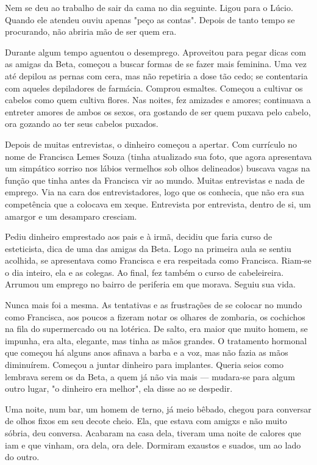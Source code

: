 \documentclass[11pt,a4paper,twoside,openany]{book}
\begin{document}
Nem se deu ao trabalho de sair da cama no dia seguinte. Ligou para o Lúcio. Quando ele atendeu ouviu apenas "peço as contas". Depois de tanto tempo se procurando, não abriria mão de ser quem era.

Durante algum tempo aguentou o desemprego. Aproveitou para pegar dicas com as amigas da Beta, começou a buscar formas de se fazer mais feminina. Uma vez até depilou as pernas com cera, mas não repetiria a dose tão cedo; se contentaria com aqueles depiladores de farmácia. Comprou esmaltes. Começou a cultivar os cabelos como quem cultiva flores. Nas noites, fez amizades e amores; continuava a entreter amores de ambos os sexos, ora gostando de ser quem puxava pelo cabelo, ora gozando ao ter seus cabelos puxados.

Depois de muitas entrevistas, o dinheiro começou a apertar. Com currículo no nome de Francisca Lemes Souza (tinha atualizado sua foto, que agora apresentava um simpático sorriso nos lábios vermelhos sob olhos delineados) buscava vagas na função que tinha antes da Francisca vir ao mundo. Muitas entrevistas e nada de emprego. Via na cara dos entrevistadores, logo que os conhecia, que não era sua competência que a colocava em xeque. Entrevista por entrevista, dentro de si, um amargor e um desamparo cresciam.

Pediu dinheiro emprestado aos pais e à irmã, decidiu que faria curso de esteticista, dica de uma das amigas da Beta. Logo na primeira aula se sentiu acolhida, se apresentava como Francisca e era respeitada como Francisca. Riam-se o dia inteiro, ela e as colegas. Ao final, fez também o curso de cabeleireira. Arrumou um emprego no bairro de periferia em que morava. Seguiu sua vida.

Nunca mais foi a mesma. As tentativas e as frustrações de se colocar no mundo como Francisca, aos poucos a fizeram notar os olhares de zombaria, os cochichos na fila do supermercado ou na lotérica. De salto, era maior que muito homem, se impunha, era alta, elegante, mas tinha as mãos grandes. O tratamento hormonal que começou há alguns anos afinava a barba e a voz, mas não fazia as mãos diminuírem. Começou a juntar dinheiro para implantes. Queria seios como lembrava serem os da Beta, a quem já não via mais --- mudara-se para algum outro lugar, "o dinheiro era melhor", ela disse ao se despedir.

Uma noite, num bar, um homem de terno, já meio bêbado, chegou para conversar de olhos fixos em seu decote cheio. Ela, que estava com amigxs e não muito sóbria, deu conversa. Acabaram na casa dela, tiveram uma noite de calores que iam e que vinham, ora dela, ora dele. Dormiram exaustos e suados, um ao lado do outro.
\end{document}

